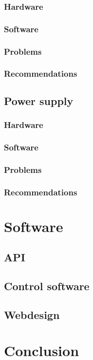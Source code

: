 \documentclass[a4paper,oneside]{book}
\begin{document}
\subsection{Hardware}
\subsection{Software}
\subsection{Problems}
\subsection{Recommendations}

\section{Power supply}
\subsection{Hardware}
\subsection{Software}
\subsection{Problems}
\subsection{Recommendations}

\chapter{Software}
\label{ch:software}
\section{API}
\section{Control software}
\section{Webdesign}

\chapter{Conclusion}
\end{document}
